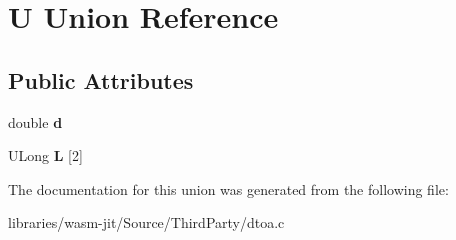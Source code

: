 \hypertarget{union_u}{}\section{U Union Reference}
\label{union_u}
\subsection*{Public Attributes}
\begin{DoxyCompactItemize}
\item 
\mbox{\label{union_u_a6379e5194213c802bb8c6786eca8ad50}} 
double {\bfseries d}
\item 
\mbox{\label{union_u_aa72022b00fe1608edcdbc0a12e525164}} 
U\+Long {\bfseries L} \mbox{[}2\mbox{]}
\end{DoxyCompactItemize}


The documentation for this union was generated from the following file\+:\begin{DoxyCompactItemize}
\item 
libraries/wasm-\/jit/\+Source/\+Third\+Party/dtoa.\+c\end{DoxyCompactItemize}
